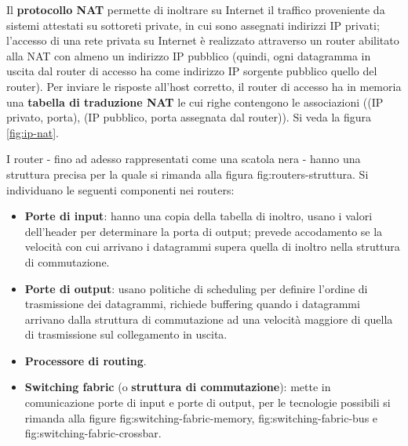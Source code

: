 \documentclass[11pt, italian, openany]{book}
\begin{document}
\begin{sloppypar}
Il \textbf{protocollo NAT} permette di inoltrare su Internet il traffico proveniente da sistemi attestati su sottoreti private, in cui sono assegnati indirizzi IP
privati; l'accesso di una rete privata su Internet \`e realizzato attraverso un router abilitato alla NAT con almeno un indirizzo IP pubblico (quindi, ogni
datagramma in uscita dal router di accesso ha come indirizzo IP sorgente pubblico quello del router). Per inviare le risposte all'host corretto, il router
di accesso ha in memoria una \textbf{tabella di traduzione NAT} le cui righe contengono le associazioni ((IP privato, porta), (IP pubblico, porta assegnata
dal router)). Si veda la figura \ref{fig:ip-nat}.

{} \label{Routers}
I router - fino ad adesso rappresentati come una scatola nera - hanno una struttura precisa per la quale si rimanda alla figura fig:routers-struttura. Si
individuano le seguenti componenti nei routers:
\begin{itemize}[itemsep=0pt,topsep=0pt,parsep=0pt]
	\item \textbf{Porte di input}: hanno una copia della tabella di inoltro, usano i valori dell’header per determinare la porta di output; prevede accodamento
	se la velocit\`a con cui arrivano i datagrammi supera quella di inoltro nella struttura di commutazione.
	\item \textbf{Porte di output}: usano politiche di scheduling per definire l'ordine di trasmissione dei datagrammi, richiede buffering quando i datagrammi
	arrivano dalla struttura di commutazione ad una velocit\`a maggiore di quella di trasmissione sul collegamento in uscita.
	\item \textbf{Processore di routing}.
	\item \textbf{Switching fabric} (o \textbf{struttura di commutazione}): mette in comunicazione porte di input e porte di output, per le tecnologie possibili
	si rimanda alla figure fig:switching-fabric-memory, fig:switching-fabric-bus e fig:switching-fabric-crossbar.
\end{itemize}


\pagebreak


\end{sloppypar}
\end{document}
